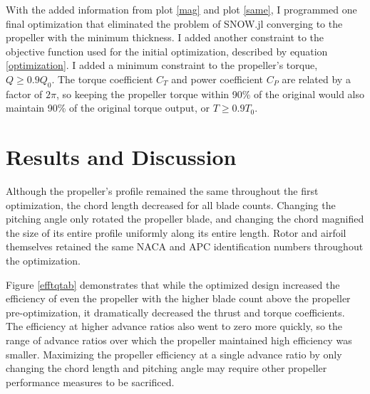 \documentclass[journal ]{new-aiaa}
\begin{document}
With the added information from plot \eqref{mag} and plot \eqref{same}, I programmed one final optimization that eliminated the problem of SNOW.jl converging to the propeller with the minimum thickness. I added another constraint to the objective function used for the initial optimization, described by equation \eqref{optimization}. I added a minimum constraint to the propeller's torque, $Q \geq 0.9 Q_{0}$. The torque coefficient $C_{T}$ and power coefficient $C_{P}$ are related by a factor of $2 \pi$, so keeping the propeller torque within 90\% of the original would also maintain 90\% of the original torque output, or $T \geq 0.9 T_{0}$.


\section{Results and Discussion}

Although the propeller's profile remained the same throughout the first optimization, the chord length decreased for all blade counts. Changing the pitching angle only rotated the propeller blade, and changing the chord magnified the size of its entire profile uniformly along its entire length. Rotor and airfoil themselves retained the same NACA and APC identification numbers throughout the optimization.

Figure \eqref{efftqtab} demonstrates that while the optimized design increased the efficiency of even the propeller with the higher blade count above the propeller pre-optimization, it dramatically decreased the thrust and torque coefficients. The efficiency at higher advance ratios also went to zero more quickly, so the range of advance ratios over which the propeller maintained high efficiency was smaller. Maximizing the propeller efficiency at a single advance ratio by only changing the chord length and pitching angle may require other propeller performance measures to be sacrificed.
\end{document}

